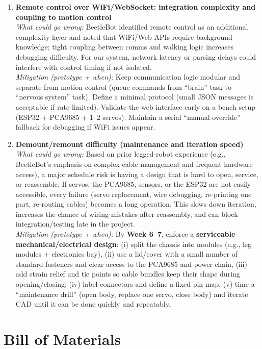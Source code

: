 \documentclass{article}
\begin{document}
\begin{enumerate}
  \item \textbf{Remote control over WiFi/WebSocket: integration complexity and coupling to motion control} \\
        \textit{What could go wrong:} BeetleBot identified remote control as an additional complexity layer and noted that WiFi/Web APIs require background knowledge; tight coupling between comms and walking logic increases debugging difficulty. For our system, network latency or parsing delays could interfere with control timing if not isolated. \\
        \textit{Mitigation (prototype + when):} Keep communication logic modular and separate from motion control (queue commands from “brain” task to “nervous system” task). Define a minimal protocol (small JSON messages is acceptable if rate-limited). Validate the web interface early on a bench setup (ESP32 + PCA9685 + 1--2 servos). Maintain a serial “manual override” fallback for debugging if WiFi issues appear.

  \item \textbf{Demount/remount difficulty (maintenance and iteration speed)} \\
        \textit{What could go wrong:} Based on prior legged-robot experience (e.g., BeetleBot’s emphasis on complex cable management and frequent hardware access), a major schedule risk is having a design that is hard to open, service, or reassemble. If servos, the PCA9685, sensors, or the ESP32 are not easily accessible, every failure (servo replacement, wire debugging, re-printing one part, re-routing cables) becomes a long operation. This slows down iteration, increases the chance of wiring mistakes after reassembly, and can block integration/testing late in the project. \\
        \textit{Mitigation (prototype + when):} By \textbf{Week 6--7}, enforce a \textbf{serviceable mechanical/electrical design}:
        (i) split the chassis into modules (e.g., leg modules + electronics bay),
        (ii) use a lid/cover with a small number of standard fasteners and clear access to the PCA9685 and power chain,
        (iii) add strain relief and tie points so cable bundles keep their shape during opening/closing,
        (iv) label connectors and define a fixed pin map,
        (v) time a “maintenance drill” (open body, replace one servo, close body) and iterate CAD until it can be done quickly and repeatably.
\end{enumerate}

\section{Bill of Materials}
\end{document}
